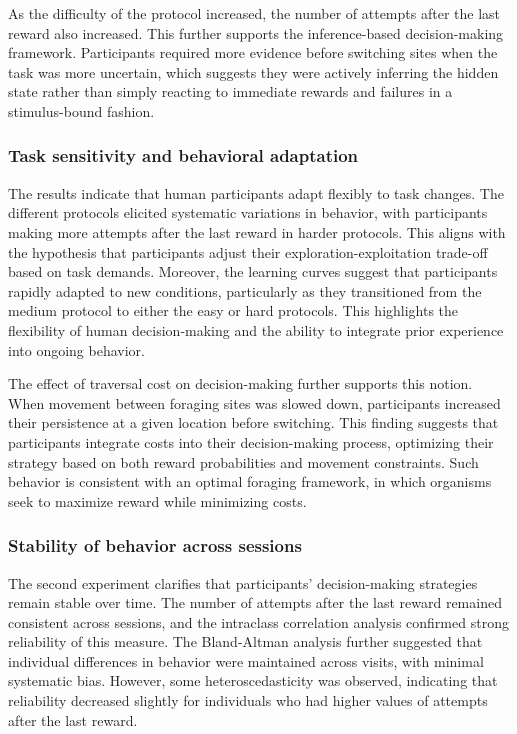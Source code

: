 \documentclass[11pt]{article}
\begin{document}
As the difficulty of the protocol increased, the number of attempts after the last reward also increased. This further supports the inference-based decision-making framework. Participants required more evidence before switching sites when the task was more uncertain, which suggests they were actively inferring the hidden state rather than simply reacting to immediate rewards and failures in a stimulus-bound fashion.

\subsubsection{Task sensitivity and behavioral adaptation}
The results indicate that human participants adapt flexibly to task changes. The different protocols elicited systematic variations in behavior, with participants making more attempts after the last reward in harder protocols. This aligns with the hypothesis that participants adjust their exploration-exploitation trade-off based on task demands. Moreover, the learning curves suggest that participants rapidly adapted to new conditions, particularly as they transitioned from the medium protocol to either the easy or hard protocols. This highlights the flexibility of human decision-making and the ability to integrate prior experience into ongoing behavior.

The effect of traversal cost on decision-making further supports this notion. When movement between foraging sites was slowed down, participants increased their persistence at a given location before switching. This finding suggests that participants integrate costs into their decision-making process, optimizing their strategy based on both reward probabilities and movement constraints. Such behavior is consistent with an optimal foraging framework, in which organisms seek to maximize reward while minimizing costs.

\subsubsection{Stability of behavior across sessions}
The second experiment clarifies that participants' decision-making strategies remain stable over time. The number of attempts after the last reward remained consistent across sessions, and the intraclass correlation analysis confirmed strong reliability of this measure. The Bland-Altman analysis further suggested that individual differences in behavior were maintained across visits, with minimal systematic bias. However, some heteroscedasticity was observed, indicating that reliability decreased slightly for individuals who had higher values of attempts after the last reward.
\end{document}
